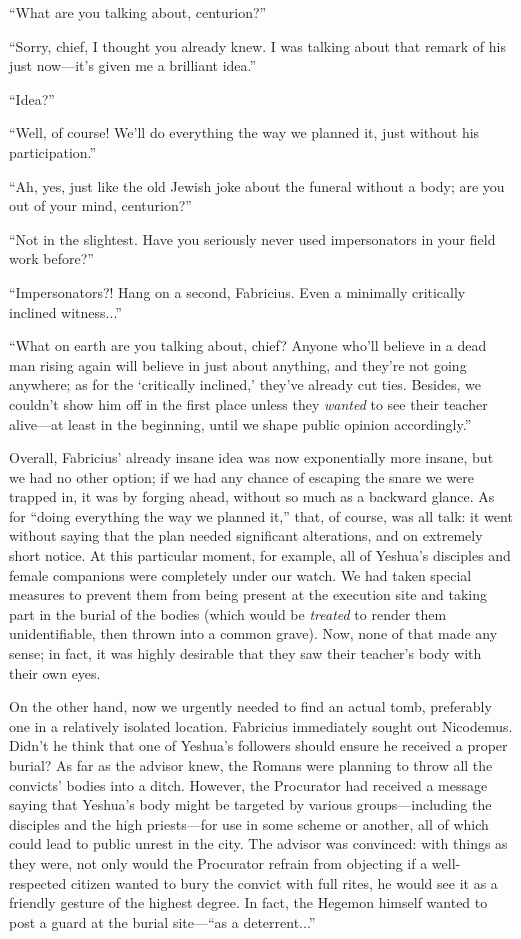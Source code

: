 ``What are you talking about, centurion?''

``Sorry, chief, I thought you already knew. I was talking about that remark of his just now---it's given me a brilliant idea.''

``Idea?''

``Well, of course! We'll do everything the way we planned it, just without his participation.''

``Ah, yes, just like the old Jewish joke about the funeral without a body; are you out of your mind, centurion?''

``Not in the slightest. Have you seriously never used impersonators in your field work before?''

``Impersonators?! Hang on a second, Fabricius. Even a minimally critically inclined witness...''

``What on earth are you talking about, chief? Anyone who'll believe in a dead man rising again will believe in just about anything, and they're not going anywhere; as for the `critically inclined,' they've already cut ties. Besides, we couldn't show him off in the first place unless they \emph{wanted} to see their teacher alive---at least in the beginning, until we shape public opinion accordingly.''

Overall, Fabricius' already insane idea was now exponentially more insane, but we had no other option; if we had any chance of escaping the snare we were trapped in, it was by forging ahead, without so much as a backward glance. As for ``doing everything the way we planned it,'' that, of course, was all talk: it went without saying that the plan needed significant alterations, and on extremely short notice. At this particular moment, for example, all of Yeshua's disciples and female companions were completely under our watch. We had taken special measures to prevent them from being present at the execution site and taking part in the burial of the bodies (which would be \emph{treated} to render them unidentifiable, then thrown into a common grave). Now, none of that made any sense; in fact, it was highly desirable that they saw their teacher's body with their own eyes.

On the other hand, now we urgently needed to find an actual tomb, preferably one in a relatively isolated location. Fabricius immediately sought out Nicodemus. Didn't he think that one of Yeshua's followers should ensure he received a proper burial? As far as the advisor knew, the Romans were planning to throw all the convicts' bodies into a ditch. However, the Procurator had received a message saying that Yeshua's body might be targeted by various groups---including the disciples and the high priests---for use in some scheme or another, all of which could lead to public unrest in the city. The advisor was convinced: with things as they were, not only would the Procurator refrain from objecting if a well-respected citizen wanted to bury the convict with full rites, he would see it as a friendly gesture of the highest degree. In fact, the Hegemon himself wanted to post a guard at the burial site---``as a deterrent...''

